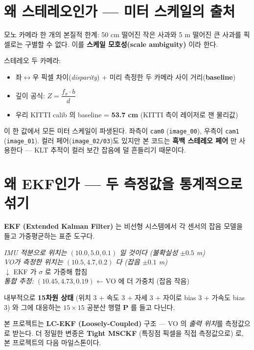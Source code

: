\documentclass[11pt,a4paper,oneside]{report}
\begin{document}
\section{왜 스테레오인가 — 미터 스케일의 출처}

모노 카메라 한 개의 본질적 한계: 50 cm 떨어진 작은 사과와 5 m 떨어진 큰 사과를 픽셀로는 구별할 수 없다. 이를 \textbf{스케일 모호성(scale ambiguity)} 이라 한다.

스테레오 두 카메라:
\begin{itemize}
\item 좌\(\leftrightarrow\)우 픽셀 차이(\emph{disparity}) + 미리 측정한 두 카메라 사이 거리(\textbf{baseline})
\item 깊이 공식: \(\boxed{Z = \dfrac{f_x \cdot b}{d}}\)
\item 우리 KITTI calib 의 baseline = \textbf{53.7 cm} (KITTI 측이 레이저로 잰 물리값)
\end{itemize}

이 한 값에서 모든 미터 스케일이 파생된다. 좌측이 \texttt{cam0} (\texttt{image\_00}), 우측이 \texttt{cam1} (\texttt{image\_01}). 컬러 페어(\texttt{image\_02/03})도 있지만 본 코드는 \textbf{흑백 스테레오 페어} 만 사용한다 — KLT 추적이 컬러 보간 잡음에 덜 흔들리기 때문이다.

\section{왜 EKF인가 — 두 측정값을 통계적으로 섞기}

\textbf{EKF (Extended Kalman Filter)} 는 비선형 시스템에서 각 센서의 잡음 모델을 들고 가중평균하는 표준 도구다.

\begin{kbox}
\textit{IMU 적분으로 위치는 \((10.0, 5.0, 0.1)\) 일 것이다 (불확실성 \(\pm 0.5\) m)} \\
\textit{VO가 측정한 위치는 \((10.5, 4.7, 0.2)\) 다 (잡음 \(\pm 0.1\) m)} \\
\(\downarrow\) EKF 가 \(\sigma\) 로 가중해 합침 \\
\textit{통합 추정: \((10.45, 4.73, 0.19)\)} \quad ← VO 에 더 가중치 (잡음 작음)
\end{kbox}

내부적으로 \textbf{15차원 상태} (위치 3 + 속도 3 + 자세 3 + 자이로 bias 3 + 가속도 bias 3) 와 그에 대응하는 \(15 \times 15\) 공분산 행렬 \(\mathbf{P}\) 를 들고 다닌다.

본 프로젝트는 \textbf{LC-EKF (Loosely-Coupled)} 구조 — VO 의 \emph{출력 위치}를 측정값으로 받는다. 더 정밀한 변종은 \textbf{Tight MSCKF} (특징점 픽셀을 직접 측정값으로) 로, 본 프로젝트의 다음 마일스톤이다.
\end{document}

